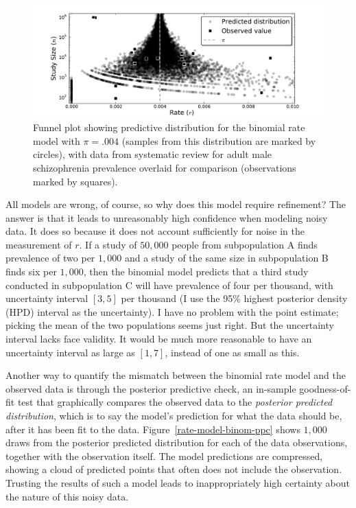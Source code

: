 \begin{figure}[ht]
\begin{center}
\includegraphics[width=\textwidth]{binomial-model-funnel.pdf}
\end{center}
\caption{Funnel plot showing predictive distribution for the binomial
  rate model with $\pi=.004$ (samples from this distribution are
  marked by circles), with data from systematic review for adult male
  schizophrenia prevalence overlaid for comparison (observations
  marked by squares).}
\label{rate-model-binom-funnel}
\end{figure}

All models are wrong, of course, so why does this model require
refinement? The answer is that it leads to unreasonably high
confidence when modeling noisy data.  It does so because it does not
account sufficiently for noise in the measurement of $r$. If a study
of $50,000$ people from subpopulation A finds prevalence of two per
$1,000$ and a study of the same size in subpopulation B finds six per
$1,000$, then the binomial model predicts that a third study conducted
in subpopulation C will have prevalence of four per thousand, with
uncertainty interval $[3,5]$ per thousand (I use the 95\% highest
posterior density (HPD) interval as the uncertainty).  I have no
problem with the point estimate; picking the mean of the two
populations seems just right.  But the uncertainty interval lacks face
validity.  It would be much more reasonable to have an uncertainty
interval as large as $[1,7]$, instead of one as small as this.

Another way to quantify the mismatch between the binomial rate model
and the observed data is through the posterior predictive check, an
in-sample goodness-of-fit test that graphically compares the observed
data to the \emph{posterior predicted distribution}, which is to say
the model's prediction for what the data should be, after it has been
fit to the data.\cite{gelman_bayesian_2003}
Figure~\ref{rate-model-binom-ppc} shows $1,000$ draws from the
posterior predicted distribution for each of the data observations,
together with the observation itself.  The model predictions are
compressed, showing a cloud of predicted points that often does not
include the observation.  Trusting the results of such a model leads
to inappropriately high certainty about the nature of this noisy data.

